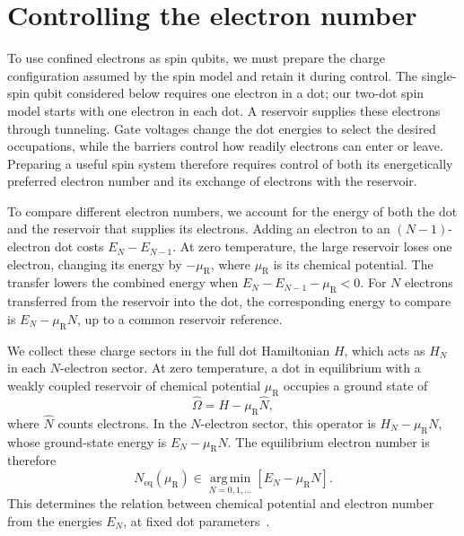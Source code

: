 \section{Controlling the electron number}
\label{sec:electron-number-control}

To use confined electrons as spin qubits, we must prepare the charge
configuration assumed by the spin model and retain it during control.
The single-spin qubit considered below requires one electron in a dot;
our two-dot spin model starts with one electron in each dot. A reservoir
supplies these electrons through tunneling. Gate voltages change the
dot energies to select the desired occupations, while the barriers
control how readily electrons can enter or leave. Preparing a useful
spin system therefore requires control of both its energetically
preferred electron number and its exchange of electrons with the reservoir.

To compare different electron numbers, we account for the energy of
both the dot and the reservoir that supplies its electrons. Adding
an electron to an $(N-1)$-electron dot costs $E_N-E_{N-1}$.
At zero temperature, the large reservoir loses one electron, changing
its energy by $-\mu_{\mathrm R}$, where $\mu_{\mathrm R}$ is its chemical potential.
The transfer lowers the combined energy when
$E_N-E_{N-1}-\mu_{\mathrm R}<0$. For $N$ electrons transferred
from the reservoir into the dot, the corresponding energy to compare
is $E_N-\mu_{\mathrm R}N$, up to a common reservoir reference.

We collect these charge sectors in the full dot Hamiltonian $H$,
which acts as $H_N$ in each $N$-electron sector.
At zero temperature, a dot in equilibrium with a weakly coupled
reservoir of chemical potential $\mu_{\mathrm R}$ occupies a
ground state of
\begin{equation}
  \widehat{\Omega}=H-\mu_{\mathrm R}\widehat N,
  \label{eq:dot-grand-canonical-hamiltonian}
\end{equation}
where $\widehat N$ counts electrons. In the $N$-electron sector,
this operator is $H_N-\mu_{\mathrm R}N$, whose ground-state
energy is $E_N-\mu_{\mathrm R}N$.
The equilibrium electron number is therefore
\begin{equation}
  \boxed{
  N_{\mathrm{eq}}(\mu_{\mathrm R})
    \in\operatorname*{arg\,min}_{N=0,1,\ldots}
                         [E_N-\mu_{\mathrm R}N]}.
  \label{eq:dot-equilibrium-electron-number}
\end{equation}
This determines the relation between chemical potential and
electron number from the energies $E_N$, at fixed dot parameters~\cite{Beenakker1991}.

